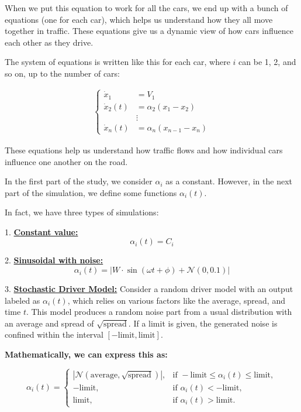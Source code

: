 \documentclass{article}
\begin{document}
			When we put this equation to work for all the cars, we end up with a bunch of equations (one for each car), which helps us understand how they all move together in traffic. These equations give us a dynamic view of how cars influence each other as they drive.
			
			The system of equations is written like this for each car, where \(i\) can be 1, 2, and so on, up to the number of cars:
			
			\begin{align*}
				\left\{
				\begin{array}{ll}
					\dot{x}_1 &= V_1 \\
					\dot{x}_2(t) &= \alpha_2(x_1 - x_2) \\
					&\vdots \\
					\dot{x}_n(t) &= \alpha_n(x_{n-1} - x_n)
				\end{array}
				\right.
			\end{align*}
			
			These equations help us understand how traffic flows and how individual cars influence one another on the road.
			
			In the first part of the study, we consider $\alpha_i$ as a constant. However, in the next part of the simulation, we define some functions $\alpha_i(t)$.
			
			In fact, we have three types of simulations:
			
			1. \textbf{\underline{Constant value:}}
			\[
			\alpha_i(t) = C_i
			\]
			
			2. \textbf{\underline{Sinusoidal with noise:}}
			\[
			\alpha_i(t) = \left| W \cdot \sin(\omega t + \phi) + \mathcal{N}(0, 0.1) \right|
			\]
			
			3. \textbf{\underline{Stochastic Driver Model:}} \newline \newline
			Consider a random driver model with an output labeled as \( \alpha_i(t) \), which relies on various factors like the average, spread, and time \( t \). This model produces a random noise part from a usual distribution with an average and spread of \( \sqrt{\text{spread}} \). If a limit is given, the generated noise is confined within the interval \([- \text{limit}, \text{limit}]\). \newline \newline
			
			\textbf{Mathematically, we can express this as:}
		
			
			\[
			\alpha_i(t) =
			\begin{cases}
				\left| \mathcal{N}(\text{average}, \sqrt{\text{spread}}) \right|, & \text{if } -\text{limit} \leq \alpha_i(t) \leq \text{limit}, \\
				-\text{limit}, & \text{if } \alpha_i(t) < -\text{limit}, \\
				\text{limit}, & \text{if } \alpha_i(t) > \text{limit}.
			\end{cases}
			\]
			
\end{document}
